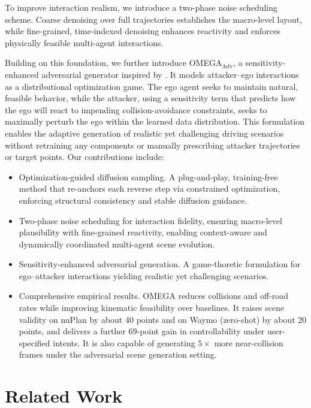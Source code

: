 \documentclass[10pt,twocolumn,letterpaper]{article}
\theoremstyle{plain}
\theoremstyle{remark}
\begin{document}
To improve interaction realism, we introduce a two-phase noise scheduling scheme. Coarse denoising over full trajectories establishes the macro-level layout, while fine-grained, time-indexed denoising enhances reactivity and enforces physically feasible multi-agent interactions.

Building on this foundation, we further introduce OMEGA$_\mathrm{Adv}$, a sensitivity-enhanced  adversarial generator inspired by \cite{fiacco1983introduction,spica2020real}. It models attacker--ego interactions as a distributional optimization game. The ego agent seeks to maintain natural, feasible behavior, while the attacker, using a sensitivity term that predicts how the ego will react to impending collision-avoidance constraints, seeks to maximally perturb the ego within the learned data distribution. This formulation enables the adaptive generation of realistic yet challenging driving scenarios without retraining any components or manually prescribing attacker trajectories or target points. Our contributions include:

\begin{itemize}
    \item Optimization-guided diffusion sampling. A plug-and-play, training-free method that re-anchors each reverse step via constrained optimization, enforcing structural consistency and stable diffusion guidance.
    \item Two-phase noise scheduling for interaction fidelity, ensuring macro-level plausibility with fine-grained reactivity, enabling context-aware and dynamically coordinated multi-agent scene evolution.
    \item Sensitivity-enhanced adversarial generation. A game-thoretic formulation for ego--attacker interactions yielding realistic yet challenging scenarios.
    \item Comprehensive empirical results. OMEGA reduces collisions and off-road rates while improving kinematic feasibility over baselines. It raises scene validity on nuPlan by about 40 points and on Waymo (zero-shot) by about 20 points, and delivers a further 69-point gain in controllability under user-specified intents. It is also capable of generating $5\times$ more near-collision frames under the adversarial scene generation setting.
\end{itemize}

\section{Related Work}
\label{sec:related}
\end{document}
